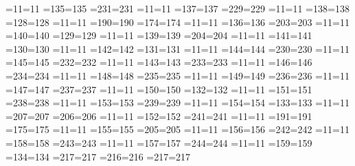 =11=11	%
=135=135
=231=231
=11=11	%
=137=137
=229=229
=11=11	%
=138=138
=128=128
=11=11	%
=190=190
=174=174
=11=11	%
=136=136
=203=203
=11=11	%
=140=140
=129=129
=11=11	%
=139=139
=204=204
=11=11	%
=141=141
=130=130
=11=11	%
=142=142
=131=131
=11=11	%
=144=144
=230=230
=11=11	%
=145=145
=232=232
=11=11	%
=143=143
=233=233
=11=11	%
=146=146
=234=234
=11=11	%
=148=148
=235=235
=11=11	%
=149=149
=236=236
=11=11	%
=147=147
=237=237
=11=11	%
=150=150
=132=132
=11=11	%
=151=151
=238=238
=11=11	%
=153=153
=239=239
=11=11	%
=154=154
=133=133
=11=11	%
=207=207
=206=206
=11=11	%
=152=152
=241=241
=11=11	%
=191=191
=175=175
=11=11	%
=155=155
=205=205
=11=11	%
=156=156
=242=242
=11=11	%
=158=158
=243=243
=11=11	%
=157=157
=244=244
=11=11	%
=159=159
=134=134
=217=217	%
=216=216
=217=217

